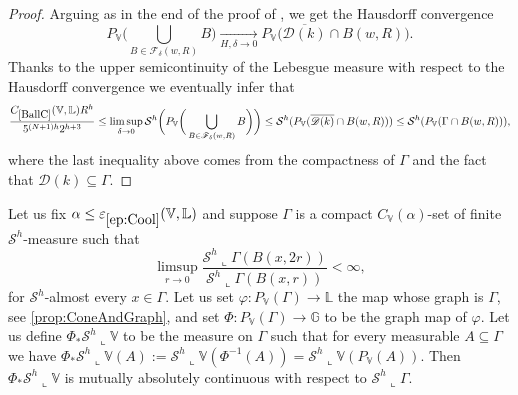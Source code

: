 \documentclass[10pt, a4paper,
oneside, headinclude,footinclude]{scrartcl}
\begin{document}
\begin{proof}
Arguing as in the end of the proof of \cite[Proposition 4.6]{antonelli2020rectifiable}, we get the Hausdorff convergence
$$
P_{\mathbb{V}}\bigg(\bigcup_{B\in \mathscr{F}_\delta(w,R)} B\bigg)\underset{H,\delta\to 0}{\longrightarrow} P_\mathbb{V}\bigg(\overline{\mathscr{D}(k)}\cap B(w,R)\bigg).
$$
Thanks to the upper semicontinuity of the Lebesgue measure with respect to the Hausdorff convergence we eventually infer that
$$\frac{\oldC{BallC}(\mathbb{V},\mathbb L) R^h}{5^{(N+1)h}2^{h+3}}\leq\limsup_{\delta\to0}\mathcal{S}^h\bigg(P_\mathbb{V}\bigg(\bigcup_{B\in \mathscr{F}_\delta(w,R)} B\bigg)\bigg)\leq \mathcal{S}^h(P_\mathbb{V}(\overline{\mathscr{D}(k)}\cap B(w,R)))\leq \mathcal{S}^h(P_\mathbb{V}(\Gamma\cap B(w,R))),$$
where the last inequality above comes from the compactness of $\Gamma$ and the fact that $\mathscr{D}(k)\subseteq \Gamma$.
\end{proof} 




\begin{proposizione}\label{prop:mutuallyabs}
Let us fix $\alpha\leq\oldep{ep:Cool}(\mathbb V,\mathbb L)$ and suppose $\Gamma$ is a compact $C_\mathbb{V}(\alpha)$-set of finite $\mathcal{S}^h$-measure such that
$$
\limsup_{r\to 0}\frac{\mathcal{S}^h\llcorner \Gamma(B(x,2r))}{\mathcal{S}^h\llcorner \Gamma(B(x,r))}<\infty,
$$
for $\mathcal{S}^h$-almost every $x\in \Gamma$. Let us set $\varphi:P_{\mathbb V}(\Gamma)\to \mathbb{L}$ the map whose graph is $\Gamma$, see \cref{prop:ConeAndGraph}, and set $\Phi:P_{\mathbb V}(\Gamma)\to\mathbb G$ to be the graph map of $\varphi$. Let us define $\Phi_*\mathcal S^h\llcorner\mathbb V$ to be the measure on $\Gamma$ such that for every measurable $A\subseteq \Gamma$ we have $\Phi_*\mathcal S^h\llcorner\mathbb V(A):=\mathcal{S}^h\llcorner\mathbb V(\Phi^{-1}(A))=\mathcal{S}^h\llcorner \mathbb V(P_{\mathbb V}(A))$. Then $\Phi_*\mathcal{S}^h\llcorner \mathbb{V}$ is mutually absolutely continuous with respect to $\mathcal{S}^h\llcorner \Gamma$.
\end{proposizione}
\end{document}
